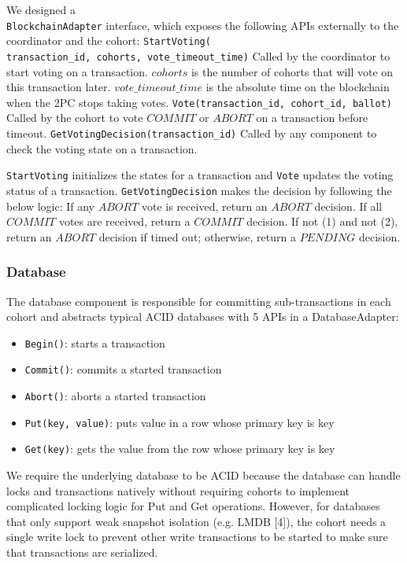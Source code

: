 \documentclass[11pt,conference]{IEEEtran}
\begin{document}
We designed a \texttt{\\BlockchainAdapter} interface, which exposes the following APIs externally to the coordinator and the cohort:
\texttt{StartVoting(\\transaction\_id, cohorts, vote\_timeout\_time)} Called by the coordinator to start voting on a transaction. $cohorts$ is the number of cohorts that will vote on this transaction later. $vote\_timeout\_time$ is the absolute time on the blockchain when the 2PC stops taking votes.
\texttt{Vote(transaction\_id, cohort\_id, ballot)} Called by the cohort to vote $COMMIT$ or $ABORT$ on a transaction before timeout.
\texttt{GetVotingDecision(transaction\_id)} Called by any component to check the voting state on a transaction.

\texttt{StartVoting} initializes the states for a transaction and \texttt{Vote} updates the voting status of a transaction. \texttt{GetVotingDecision} makes the decision by following the below logic:
If any $ABORT$ vote is received, return an $ABORT$ decision.
If all $COMMIT$ votes are received, return a $COMMIT$ decision.
If not (1) and not (2), return an $ABORT$ decision if timed out; otherwise, return a $PENDING$ decision.

\subsubsection{Database} \label{database}
The database component is responsible for committing sub-transactions in each cohort and abstracts typical ACID databases with 5 APIs in a DatabaseAdapter:
\begin{itemize}
  \item \texttt{Begin()}:  starts a transaction
  \item \texttt{Commit()}: commits a started transaction
  \item \texttt{Abort()}: aborts a started transaction
  \item \texttt{Put(key, value)}: puts value in a row whose primary key is key 
  \item \texttt{Get(key)}: gets the value from the row whose primary key is key 
\end{itemize}






We require the underlying database to be ACID because the database can handle locks and transactions natively without requiring cohorts to implement complicated locking logic for Put and Get operations. However, for databases that only support weak snapshot isolation (e.g. LMDB [4]), the cohort needs a single write lock to prevent other write transactions to be started to make sure that transactions are serialized. 
\end{document}
